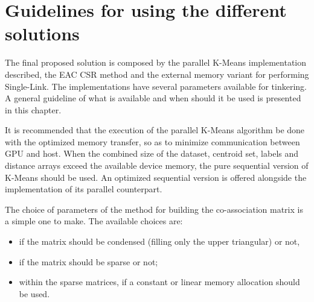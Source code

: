 



\section{Guidelines for using the different solutions}
\label{sec:solution}

The final proposed solution is composed by the parallel K-Means implementation described, the EAC CSR method and the external memory variant for performing Single-Link.
The implementations have several parameters available for tinkering.
A general guideline of what is available and when should it be used is presented in this chapter.

It is recommended that the execution of the parallel K-Means algorithm be done with the optimized memory transfer, so as to minimize communication between GPU and host.
When the combined size of the dataset, centroid set, labels and distance arrays exceed the available device memory, the pure sequential version of K-Means should be used.
An optimized sequential version is offered alongside the implementation of its parallel counterpart.

The choice of parameters of the method for building the co-association matrix is a simple one to make.
The available choices are:

\begin{itemize}
	\item if the matrix should be condensed (filling only the upper triangular) or not, 
	\item if the matrix should be sparse or not;
	\item within the sparse matrices, if a constant or linear memory allocation should be used.
\end{itemize}

